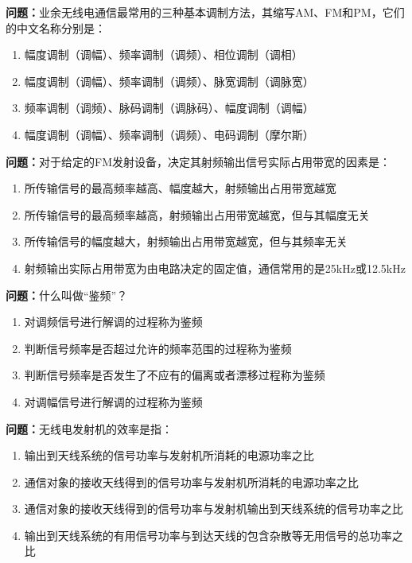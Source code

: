 \documentclass{ctexbook}
\begin{document}
\textbf{问题：}业余无线电通信最常用的三种基本调制方法，其缩写AM、FM和PM，它们的中文名称分别是：
\begin{enumerate}[label=\Alph*), leftmargin=3em]
\item 幅度调制（调幅）、频率调制（调频）、相位调制（调相）
\item 幅度调制（调幅）、频率调制（调频）、脉宽调制（调脉宽）
\item 频率调制（调频）、脉码调制（调脉码）、幅度调制（调幅）
\item 幅度调制（调幅）、频率调制（调频）、电码调制（摩尔斯）
\end{enumerate}

\textbf{问题：}对于给定的FM发射设备，决定其射频输出信号实际占用带宽的因素是：
\begin{enumerate}[label=\Alph*), leftmargin=3em]
\item 所传输信号的最高频率越高、幅度越大，射频输出占用带宽越宽
\item 所传输信号的最高频率越高，射频输出占用带宽越宽，但与其幅度无关
\item 所传输信号的幅度越大，射频输出占用带宽越宽，但与其频率无关
\item 射频输出实际占用带宽为由电路决定的固定值，通信常用的是25kHz或12.5kHz
\end{enumerate}

\textbf{问题：}什么叫做“鉴频”？
\begin{enumerate}[label=\Alph*), leftmargin=3em]
\item 对调频信号进行解调的过程称为鉴频
\item 判断信号频率是否超过允许的频率范围的过程称为鉴频
\item 判断信号频率是否发生了不应有的偏离或者漂移过程称为鉴频
\item 对调幅信号进行解调的过程称为鉴频
\end{enumerate}

\textbf{问题：}无线电发射机的效率是指：
\begin{enumerate}[label=\Alph*), leftmargin=3em]
\item 输出到天线系统的信号功率与发射机所消耗的电源功率之比
\item 通信对象的接收天线得到的信号功率与发射机所消耗的电源功率之比
\item 通信对象的接收天线得到的信号功率与发射机输出到天线系统的信号功率之比
\item 输出到天线系统的有用信号功率与到达天线的包含杂散等无用信号的总功率之比
\end{enumerate}
\end{document}
